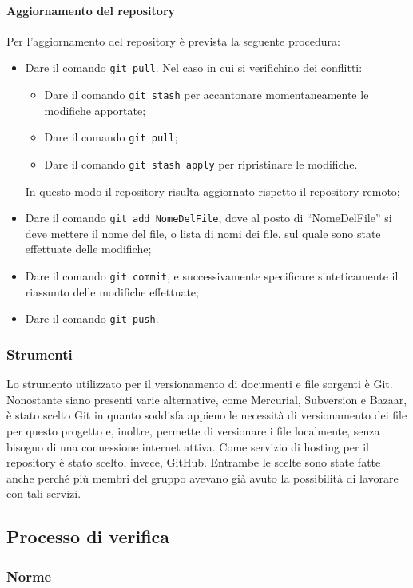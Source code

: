 \documentclass[../NormeProgetto.tex]{subfiles}
\begin{document}
	\paragraph{Aggiornamento del repository}
	Per l'aggiornamento del repository è prevista la seguente procedura:
	\begin{itemize}
		\item Dare il comando \texttt{git pull}. Nel caso in cui si verifichino dei conflitti:
			\begin{itemize}
			\item Dare il comando \texttt{git stash} per accantonare momentaneamente le modifiche apportate;
			\item Dare il comando \texttt{git pull};
			\item Dare il comando \texttt{git stash apply} per ripristinare le modifiche.
			\end{itemize}
		In questo modo il repository risulta aggiornato rispetto il repository remoto;
		\item Dare il comando \texttt{git add NomeDelFile}, dove al posto di ``NomeDelFile'' si deve mettere il nome del file, o lista di nomi dei file, sul quale sono state effettuate delle modifiche;
		\item Dare il comando \texttt{git commit}, e successivamente specificare sinteticamente il riassunto delle modifiche effettuate;
		\item Dare il comando \texttt{git push}.
	\end{itemize}	
	\subsubsection{Strumenti}
	Lo strumento utilizzato per il versionamento di documenti e file sorgenti è Git. Nonostante siano presenti varie alternative, come Mercurial, Subversion e Bazaar, è stato scelto Git in quanto soddisfa appieno le necessità di versionamento dei file per questo progetto e, inoltre, permette di versionare i file localmente, senza bisogno di una connessione internet attiva. Come servizio di hosting per il repository è stato scelto, invece, GitHub. Entrambe le scelte sono state fatte anche perché più membri del gruppo avevano già avuto la possibilità di lavorare con tali servizi.
	
	
\subsection{Processo di verifica}
	\subsubsection{Norme}
\end{document}
